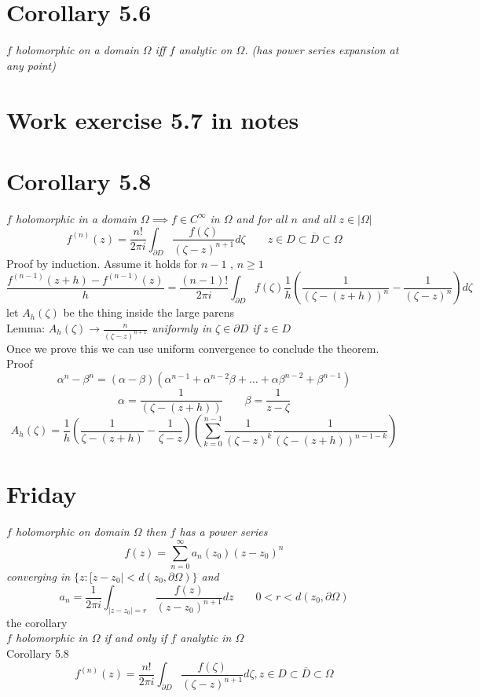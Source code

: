 \documentclass[11pt]{article}
\begin{document}
\section{Corollary 5.6}
\emph{
    $f$ holomorphic on a domain $\Omega$ iff  $f$ analytic on  $\Omega$. (has power series expansion at any point)
}

\section{Work exercise 5.7 in notes}

\section{Corollary 5.8}
\emph{
    $f$ holomorphic in a domain $\Omega \implies f \in C^{\infty}$ in $\Omega$ and for all  $n$ and all  $z \in |\Omega|$
     \[
    f^{(n)}(z) = \frac{n!}{2\pi i}\int_{\partial D}^{}\frac{f(\zeta)}{(\zeta - z)^{n+1}}d \zeta \qquad z \in D \subset \overline{ D} \subset \Omega
    \] 
}
Proof by induction. Assume it holds for $n-1$ ,  $n \ge 1$ 
 \[
     \frac{f^{(n-1)}(z+h) - f^{(n-1)}(z)}{h} = \frac{(n-1)!}{2\pi i}\int_{\partial D}^{}f(\zeta)\frac{1}{h}\left(\frac{1}{(\zeta - (z+h))^{n}} - \frac{1}{(\zeta - z)^{n}}\right)d \zeta
\] 
let $A_h(\zeta)$ be the thing inside the large parens\\
Lemma:
\emph{
    $A_h(\zeta) \rightarrow \frac{n}{(\zeta - z)^{n+1}}$ uniformly in $\zeta \in \partial D$ if $z \in D$
}\\
Once  we prove this we can use uniform convergence to conclude the theorem.\\
Proof
\[
\alpha^{n} - \beta^{n} = (\alpha-\beta)(\alpha^{n-1} + \alpha^{n-2}\beta + \dots + \alpha\beta^{n-2} + \beta^{n-1})
\] 
\[
\alpha = \frac{1}{(\zeta - (z+h))} \qquad \beta = \frac{1}{z - \zeta}
\] 
\[
A_h(\zeta) = \frac{1}{h}(\frac{1}{\zeta - (z+h)} - \frac{1}{\zeta - z})\left(\sum_{k=0}^{n-1}\frac{1}{(\zeta-z)^{k}}\frac{1}{(\zeta - (z+h))^{n-1-k}}\right)
\] 

\section{Friday}
\emph{
    $f$ holomorphic on domain $\Omega$ then  $f$ has a power series
    \[
    f(z) = \sum_{n=0}^{\infty}a_n(z_0)(z-z_0)^{n}
    \] 
    converging in $\{z : [z-z_0| < d(z_0, \partial \Omega)\}$
    and 
    \[
    a_n = \frac{1}{2\pi i} \int_{|z-z_0| = r}^{}\frac{f(z)}{(z-z_{0})^{n+1}}dz \qquad 0 < r < d(z_0, \partial \Omega)
    \] 
}
the corollary\\
\emph{
    $f$ holomorphic in  $\Omega$ if and only if  $f$ analytic in $\Omega$
}\\
Corollary 5.8\\
\emph{
    \[
    f^{(n)}(z) = \frac{n!}{2\pi i} \int_{ \partial D}^{} \frac{f(\zeta)}{(\zeta - z)^{n+1}} d \zeta , z \in D \subset \overline{ D} \subset \Omega
    \] 
}
\end{document}
